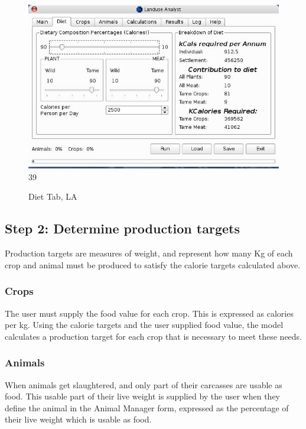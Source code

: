 \begin{figure}[htbp]
  \label{fig:LADiet}%
    \includegraphics[scale=.355]{./images/LanduseAnalystDiet545.jpg}
39
  \caption{ Diet Tab, LA}
\end{figure}

\subsection{Step 2: Determine production targets}
  Production targets are measures of weight, and represent how many Kg of each
  crop and animal must be produced to satisfy the calorie targets calculated
  above.

  \subsubsection{Crops}
The user must supply the food value for each crop.  This is expressed as calories per kg.  Using the calorie targets and
the user supplied food value, the model calculates a production target for each crop that is necessary to meet these needs.

  \subsubsection{Animals}
When animals get slaughtered, and only part of their carcasses are usable as
food.  This usable part of their live weight is supplied by the user when they
define the animal in the Animal Manager form, expressed as the percentage of
their live weight which is usable as food.

